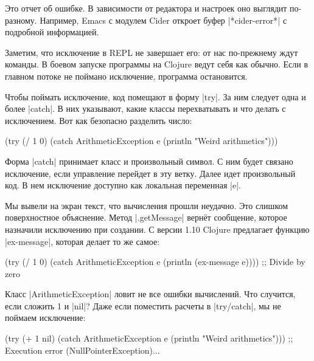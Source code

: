 Это отчет об ошибке. В зависимости от редактора и настроек оно выглядит
по-разному. Например, Emacs с модулем Cider откроет буфер \spverb|*cider-error*|
с подробной информацией.

Заметим, что исключение в REPL не завершает его: от нас по-прежнему ждут
команды. В боевом запуске программы на Clojure ведут себя как обычно. Если в
главном потоке не поймано исключение, программа остановится.

Чтобы поймать исключение, код помещают в форму \spverb|try|. За ним следует одна
и более \spverb|catch|. В них указывают, какие классы перехватывать и что делать
с исключением. Вот как безопасно разделить число:

\begin{english}
  \begin{clojure}
(try
  (/ 1 0)
  (catch ArithmeticException e
    (println "Weird arithmetics")))
  \end{clojure}
\end{english}

Форма \spverb|catch| принимает класс и произвольный символ. С ним будет связано
исключение, если управление перейдет в эту ветку. Далее идет произвольный код. В
нем исключение доступно как локальная переменная \spverb|e|.

Мы вывели на экран текст, что вычисления прошли неудачно. Это слишком
поверхностное объяснение. Метод \spverb|.getMessage| верн\"{е}т сообщение, которое
назначили исключению при создании. С версии 1.10 Clojure предлагает функцию
\spverb|ex-message|, которая делает то же самое:

\begin{english}
  \begin{clojure}
(try
  (/ 1 0)
  (catch ArithmeticException e
    (println (ex-message e))))
;; Divide by zero
  \end{clojure}
\end{english}

Класс \spverb|ArithmeticException| ловит не все ошибки вычислений. Что случится,
если сложить 1 и \spverb|nil|? Даже если поместить расчеты в \spverb|try/catch|,
мы не поймаем исключение:

\begin{english}
  \begin{clojure}
(try
  (+ 1 nil)
  (catch ArithmeticException e
    (println "Weird arithmetics")))
;; Execution error (NullPointerException)...
  \end{clojure}
\end{english}

